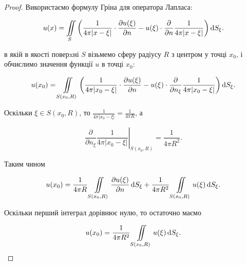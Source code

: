 \begin{proof}
	Використаємо формулу Гріна для оператора Лапласа:

	\begin{equation}
		u(x) = \displaystyle\iint\limits_S \left( \frac{1}{4 \pi |x - \xi|} \cdot \frac{\partial u(\xi)}{\partial n} - u(\xi) \cdot \frac{\partial}{\partial n} \frac{1}{4 \pi |x - \xi|} \right) \mathop{}\!\mathrm{d} S_\xi.
	\end{equation}

	в якій в якості поверxні $S$ візьмемо сферу радіусу $R$ з центром у точці $x_0$, і обчислимо значення функції $u$ в точці $x_0$:

	\begin{equation}
		u(x_0) = \displaystyle\iint\limits_{S(x_0, R)} \left( \frac{1}{4 \pi |x_0 - \xi|} \cdot \frac{\partial u(\xi)}{\partial n} - u(\xi) \cdot \frac{\partial}{\partial n_\xi} \frac{1}{4 \pi |x_0 - \xi|} \right) \mathop{}\!\mathrm{d} S_\xi.
	\end{equation}
	 
	Оскільки $\xi \in S(x_0, R)$, то $\frac{1}{4 \pi |x_0 - \xi|} = \frac{1}{4 \pi R}$, а

	\begin{equation}
		\left. \frac{\partial}{\partial n_\xi} \frac{1}{4 \pi |x_0 - \xi|} \right|_{S(x_0, R)} = \frac{1}{4 \pi R^2}.
	\end{equation}

	Таким чином 

	\begin{equation}
		u(x_0) = \frac{1}{4 \pi R} \displaystyle\iint\limits_{S(x_0, R)} \frac{\partial u(\xi)}{\partial n} \mathop{}\!\mathrm{d} S_\xi + \frac{1}{4 \pi R^2} \displaystyle\iint\limits_{S(x_0, R)} u(\xi) \mathop{}\!\mathrm{d} S_\xi.
	\end{equation}

	Оскільки перший інтеграл дорівнює нулю, то остаточно маємо

	\begin{equation}
		u(x_0) = \frac{1}{4 \pi R^2} \displaystyle\iint\limits_{S(x_0, R)} u(\xi) \mathop{}\!\mathrm{d} S_\xi .
	\end{equation}
\end{proof}


